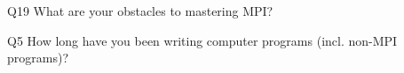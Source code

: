 \begin{description}%
\item{Q19} What are your obstacles to mastering MPI?%
\item{Q5} How long have you been writing computer programs (incl. non-MPI programs)?%
\end{description}%
